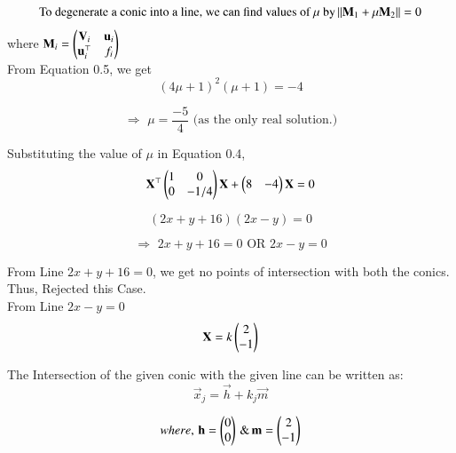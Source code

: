 \documentclass[journal]{IEEEtran}
\begin{document}
\begin{equation}
\text{To degenerate a conic into a line, we can find values of $\mu$ by} \left\lVert\mathbf{M}_1 + \mu\mathbf{M}_2\right\rVert =0
\end{equation}
where $\mathbf{M}_i = \begin{pmatrix}\mathbf{V}_i & \mathbf{u}_i \\ \mathbf{u}_i^\top & f_i\end{pmatrix}$\\

From Equation 0.5, we get 
\begin{equation}
    (4\mu+1)^2(\mu + 1) = -4
\end{equation}

\begin{equation}
\Rightarrow \, \, \mu = \dfrac{-5}{4} \text{ (as the only real solution.)}    
\end{equation}

Substituting the value of $\mu$ in Equation 0.4,
\begin{equation}
\mathbf{X}^\top\begin{pmatrix}1 & 0 \\ 0 & -1/4\end{pmatrix}\mathbf{X} + \begin{pmatrix}8 & -4\end{pmatrix}\mathbf{X} = 0
\end{equation}

\begin{equation}
    (2x+y+16)(2x-y) = 0
\end{equation}

\begin{equation}
   \Rightarrow \, \, 2x + y + 16 =0 \text{ OR } 2x-y=0
\end{equation}

From Line $2x + y + 16 =0$, we get no points of intersection with both the conics.\\
Thus, Rejected this Case.\\

From Line $2x-y=0$
\begin{equation}
    \mathbf{X} = k\begin{pmatrix}2 \\ -1\end{pmatrix} 
\end{equation}

The Intersection of the given conic with the given line can be written as:
\begin{equation}
    \vec{x}_j = \vec{h} + k_j\vec{m}
\end{equation}

\begin{equation}
where, \, \mathbf{h} = \begin{pmatrix}0 \\ 0\end{pmatrix} \, \& \, \mathbf{m} = \begin{pmatrix}2 \\ -1\end{pmatrix}   
\end{equation}
\end{document}
